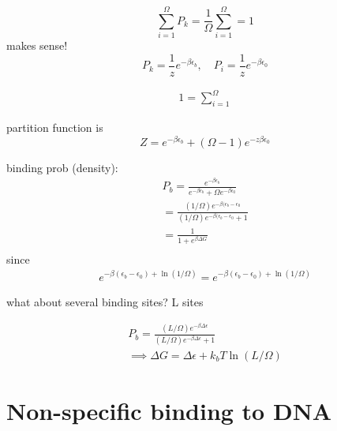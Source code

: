 \documentclass{article}
\begin{document}
\begin{equation}
	\sum _{i = 1}^{\Omega}P_k = \frac{1}{\Omega}\sum _{i = 1}^{\Omega} = 1 
\end{equation}
makes sense! 
\begin{equation}
	P_k = \frac{1}{z}e ^ {-\beta \epsilon_b},\quad P_i = \frac{1}{z}e ^ {-\beta \epsilon_0}
\end{equation}

\begin{equation}
	\begin{split}
	1 = \sum _{i = 1}^\Omega  
	\end{split}
\end{equation}


partition function is 
\begin{equation}
	Z = e ^{-\beta \epsilon_b} + (\Omega - 1)e^{-z\beta\epsilon_0}
\end{equation}


binding prob (density): 
\begin{equation}
	\begin{split}
	P_b = \frac{e ^ {-\beta\epsilon_b} }{e ^ {-\beta\epsilon_b} + \Omega e ^ {-\beta\epsilon_0} } \\
	= \frac{(1/\Omega )e ^ {-\beta(\epsilon_b - \epsilon_0} }{(1/\Omega )e ^ {-\beta(\epsilon_b - \epsilon_0}+1}\\
	= \frac{1}{1 + e ^ {\beta\Delta G} }\\
	\end{split}
\end{equation}
since 
\begin{equation}
	\begin{split}
	e ^ {-\beta(\epsilon_b - \epsilon_0) + \ln (1/\Omega )} =  e ^ {-\beta(\epsilon_b - \epsilon_0) + \ln (1/\Omega )}
	\end{split}
\end{equation}


what about several binding sites? L sites
 

\begin{equation}
	\begin{split}
		P_b = \frac{(L/\Omega)e ^ {-\beta\Delta\epsilon} }{(L/\Omega)e ^ {-\beta\Delta\epsilon} + 1}\\
			\implies \Delta G = \Delta \epsilon + k_bT\ln(L/\Omega)
	\end{split}
\end{equation}


\section{Non-specific binding to DNA}
\end{document}
